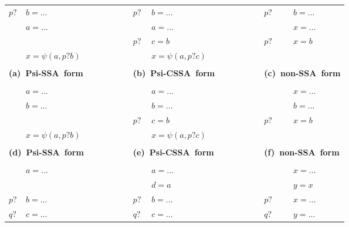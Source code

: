 \begin{figure*}
\begin{center}
\footnotesize
\begin{tabular}{llllllll}
${p?}$  & ${b = ...}$ & \ \ \ \ \ \ \ \  & ${p?}$ & ${b = ...}$ & \ \ \ \ \ \ \ \  & ${p?}$ & ${b = ...}$ \\
            & ${a = ...}$ & \ \ \ \ \ \ \ \  &            & ${a = ...}$ & \ \ \ \ \ \ \ \  &            & ${x = ...}$ \\
            &                 & \ \ \ \ \ \ \ \  & ${p?}$ & ${c = b}$   & \ \ \ \ \ \ \ \  & ${p?}$ & ${x = b}$ \\
            & ${x = \psi(a,p?b)}$ & \ \ \ \ \ \ \ \  &     & ${x = \psi(a,p?c)}$  & \ \ \ \ \ \ \ \ &     & \\
\\
\multicolumn{2}{l}{\bf (a)\ Psi-SSA\ form} & \ \ \ \ \ \ \ \  &\multicolumn{2}{l}{\bf (b)\ Psi-CSSA\ form} & \ \ \ \ \ \ \ \  &\multicolumn{2}{l}{\bf (c)\ non-SSA\ form} \\
\\
            & ${a = ...}$ & \ \ \ \ \ \ \ \  &            & ${a = ...}$ & \ \ \ \ \ \ \ \  &            & ${x = ...}$ \\
            & ${b = ...}$ & \ \ \ \ \ \ \ \  &            & ${b = ...}$ & \ \ \ \ \ \ \ \  &            & ${b = ...}$ \\
            &                 & \ \ \ \ \ \ \ \  & ${p?}$ & ${c = b}$   & \ \ \ \ \ \ \ \  & ${p?}$ & ${x = b}$ \\
            & ${x = \psi(a,p?b)}$ & \ \ \ \ \ \ \ \  &     & ${x = \psi(a,p?c)}$  & \ \ \ \ \ \ \ \ &     & \\
\\
\multicolumn{2}{l}{\bf (d)\ Psi-SSA\ form} & \ \ \ \ \ \ \ \  &\multicolumn{2}{l}{\bf (e)\ Psi-CSSA\ form} & \ \ \ \ \ \ \ \  &\multicolumn{2}{l}{\bf (f)\ non-SSA\ form} \\
\\
            & ${a = ...}$ & \ \ \ \ \ \ \ \  &            & ${a = ...}$ & \ \ \ \ \ \ \ \  &            & ${x = ...}$ \\
            &                 & \ \ \ \ \ \ \ \  &            & ${d = a}$ & \ \ \ \ \ \ \ \  &            & ${y = x}$ \\
${p?}$  & ${b = ...}$ & \ \ \ \ \ \ \ \  & ${p?}$ & ${b = ...}$ & \ \ \ \ \ \ \ \  & ${p?}$ & ${x = ...}$ \\
${q?}$  & ${c = ...}$ & \ \ \ \ \ \ \ \  & ${q?}$ & ${c = ...}$ & \ \ \ \ \ \ \ \  & ${q?}$ & ${y = ...}$ \\

\end{tabular}
\end{center}
\end{figure*}
